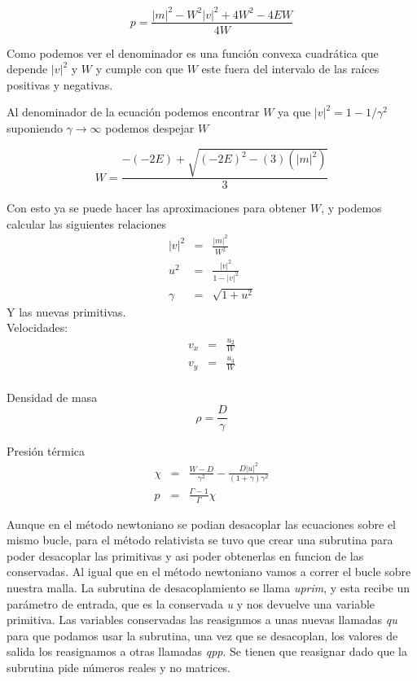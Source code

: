 \documentclass[12pt,a4paper]{book}
\providecommand{\abs}[1]{\lvert#1\rvert} %
\begin{document}
\begin{equation} \label{presion_de_newton}
p=\frac{\abs{m}^{2}-W^{2}\abs{v}^{2}+4W^{2}-4EW}{4W}
\end{equation}

Como podemos ver el denominador es una función convexa cuadrática que depende $\abs{v}^{2}$ y $W$ y cumple con que $W$ este fuera del intervalo de las raíces positivas y negativas.

Al denominador de la  ecuación podemos encontrar $W$ ya que $\abs{v}^{2}=1-1/\gamma^{2}$ suponiendo $\gamma \rightarrow \infty$ podemos despejar $W$

\begin{equation}\label{suposicion_de_W}
W=\frac{-(-2E)+\sqrt{(-2E)^{2}-(3)(\abs{m}^{2})}}{3}
\end{equation}

Con esto ya se puede hacer las aproximaciones para obtener $W$, y podemos calcular las siguientes relaciones 
\begin{eqnarray}
\abs{v}^{2} &=& \frac{\abs{m}^{2}}{W^{2}}\label{prim_v2}\\ 
u^{2}&=&\frac{\abs{v}^{2}}{1-\abs{v}^{2}}\label{u2}\\
\gamma &=& \sqrt{1+u^{2}}
\end{eqnarray}
Y las nuevas primitivas.\\

Velocidades:
\begin{eqnarray}
v_{x}&=&\frac{u_{2}}{W}\\
v_{y}&=&\frac{u_{3}}{W}\\
\end{eqnarray}

Densidad de masa 
\begin{equation}
\rho=\frac{D}{\gamma}
\end{equation}

Presión térmica
\begin{eqnarray}
\chi&=&\frac{W-D}{\gamma^{2}}-\frac{D \abs{u}^{2}}{(1+\gamma)\gamma^{2}}\\
p&=&\frac{\Gamma-1}{\Gamma} \chi
\end{eqnarray}

Aunque en el método newtoniano se podian desacoplar las ecuaciones sobre el mismo bucle, 
para el método relativista se tuvo que crear una subrutina para poder desacoplar las primitivas y asi poder obtenerlas en funcion de las conservadas. 
Al igual que en el método newtoniano vamos a correr el bucle sobre nuestra malla. La subrutina de desacoplamiento se llama \emph{uprim}, 
y esta recibe un parámetro de entrada, que es la conservada \emph{u} y nos devuelve una variable primitiva. 
Las variables conservadas las reasignmos a unas nuevas llamadas \emph{qu} para que podamos usar la subrutina, una vez que se desacoplan, 
los valores de salida los reasignamos a otras llamadas \emph{qpp}. Se tienen que reasignar dado que la subrutina pide números reales y no matrices.
\end{document}
